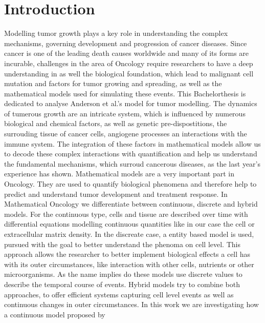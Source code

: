 \section{Introduction}
Modelling tumor growth plays a key role in understanding the complex mechanisms, 
governing development and progression of cancer diseases. Since cancer is one of the 
leading death causes worldwide and many of its forms are incurable, challenges in the area of 
Oncology require researchers to have a deep understanding in as well the biological foundation, 
which lead to malignant cell mutation and factors for tumor growing and spreading, as well as the 
mathematical models used for simulating these events. This Bachelorthesis is dedicated to 
analyse Anderson et al.'s \cite{anderson_continuous_1998,anderson_mathematical_2000} model for 
tumor modelling.\newline
The dynamics of tumerous growth are an intricate system, which is influenced by numerous biological and 
chemical factors, as well as genetic pre-dispostitions, the surrouding tissue of cancer cells, angiogene 
processes an interactions with the immune system. The integration of these factors in mathematical models
allow us to decode these complex interactions with quantification and help us understand the fundamental 
mechanisms, which surroud cancerous diseases, as the last year's experience has shown. \newline 
Mathematical models are a very important part in Oncology. They are used to quantify biological phenomena and 
therefore help to predict and understand tumor development and treatment response. In Mathematical Oncology 
we differentiate between continuous, discrete and hybrid models. For the continuous type, cells and tissue are 
described over time with differential equations modelling continuous quantities like in our case the cell or extracellular matrix density. 
In the discreate case, a entity based model is used, pursued with the goal to better understand the phenoma on cell level.
This approach allows the researcher to better implement biological effects a cell has with its outer circumstances, like interaction 
with other cells, nutrients or other microorganisms. As the name implies do these models use discrete values to describe the temporal 
course of events. Hybrid models try to combine both approaches, to offer efficient systems capturing cell level events 
as well as continuous changes in outer circumstances.
\newline In this work we are investigating how a continuous model proposed by 
